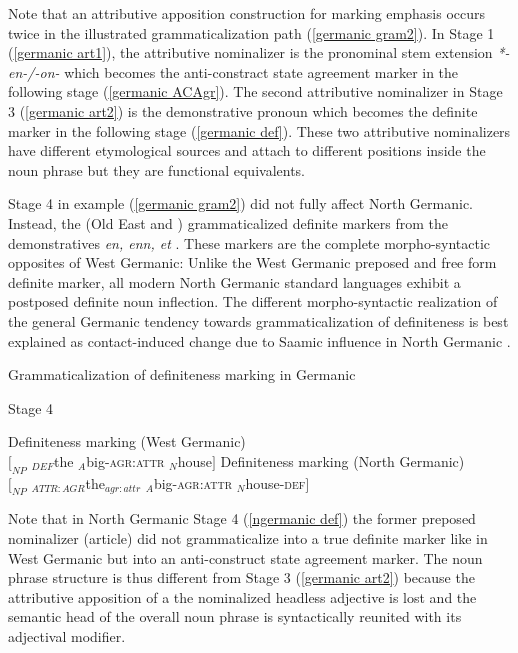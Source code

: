 {\begin{exe}
\begin{xlist}
\end{xlist}
\end{exe}
Note that an attributive apposition construction for marking emphasis occurs twice in the illustrated grammaticalization path (\ref{germanic gram2}). In Stage 1 (\ref{germanic art1}), the attributive nominalizer is the pronominal stem extension \textit{*-en-/-on-} which becomes the anti-constract state agreement marker in the following stage (\ref{germanic ACAgr}). The second attributive nominalizer in Stage 3 (\ref{germanic art2}) is the demonstrative pronoun which becomes the definite marker in the following stage (\ref{germanic def}). These two attributive nominalizers have different etymological sources and attach to different positions inside the noun phrase but they are functional equivalents.

Stage 4 in example (\ref{germanic gram2}) did not fully affect North Germanic. Instead, the  (Old East and ) grammaticalized definite markers from the demonstratives \textit{en, enn, et} \citep[15]{heinrichs1954}. These markers are the complete morpho-syntactic opposites of West Germanic: Unlike the West Germanic preposed and free form definite marker, all modern North Germanic standard languages exhibit a postposed definite noun inflection. The different morpho-syntactic realization of the general Germanic tendency towards grammaticalization of definiteness is best explained as contact-induced change due to Saamic influence in North Germanic \citep{kusmenko2008}.
\begin{exe}
\label{germanic gram3}
\ex \rm{Grammaticalization of definiteness marking in Germanic}
\begin{xlist}
\ex \rm{Stage 4}
\begin{xlist}
\ex \rm{Definiteness marking (West Germanic)}\\
$[_{NP}$ $_{DEF}$the $_{A}$big-\textsc{agr:attr} $_{N}$house$]$
\ex \rm{Definiteness marking (North Germanic)}\\
$[_{NP}$ $_{ATTR:AGR}$the$_{agr:attr}$ $_{A}$big-\textsc{agr:attr} $_{N}$house-\textsc{def}$]$\label{ngermanic def}
\end{xlist}
\end{xlist}
\end{exe}
Note that in North Germanic Stage 4 (\ref{ngermanic def}) the former preposed nominalizer (article) did not grammaticalize into a true definite marker like in West Germanic but into an anti-construct state agreement marker. The noun phrase structure is thus different from Stage 3 (\ref{germanic art2}) because the attributive apposition of a the nominalized headless adjective is lost and the semantic head of the overall noun phrase is syntactically reunited with its adjectival modifier.

}
